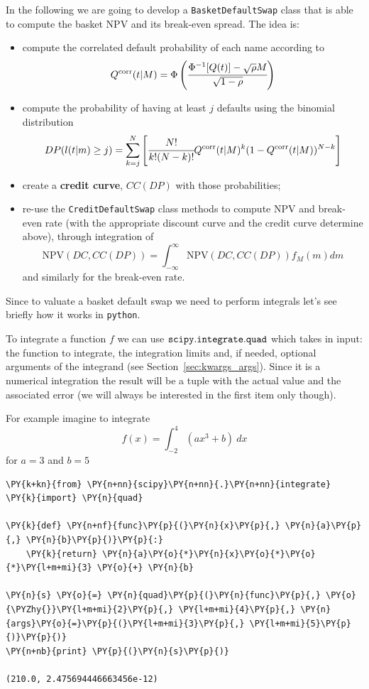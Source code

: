 In the following we are going to develop a \texttt{BasketDefaultSwap} class that is able to compute the basket NPV and its break-even spread.
The idea is:
\begin{itemize}
\item compute the correlated default probability of each name according to 
\begin{equation}
Q^{\textrm{corr}}(t|M) = \Phi\left(\cfrac{\Phi^{-1}[Q(t)]-\sqrt{\rho} M}{\sqrt{1-\rho}}\right)
\end{equation}
\item compute the probability of having at least $j$ defaults using the binomial distribution
\begin{equation}
DP(l(t|m) \ge j) = \sum_{k=j}^{N}\left[  \cfrac{N!}{k!(N-k)!}Q^{\textrm{corr}}(t|M)^k(1-Q^{\textrm{corr}}(t|M))^{N-k}\right]
\end{equation}
\item create a \textbf{credit curve}, $CC(DP)$ with those probabilities;
\item re-use the \texttt{CreditDefaultSwap} class methods to compute NPV and break-even rate (with the appropriate discount curve and the credit curve determine above), through integration of
\begin{equation}
\mathrm{NPV}(DC, CC(DP)) = \int_{-\infty}^{\infty}{\mathrm{NPV}(DC, CC(DP)) f_M(m)dm} 
\end{equation}
and similarly for the break-even rate.
\end{itemize}

Since to valuate a basket default swap we need to perform integrals let's see briefly how it works in \texttt{python}.

To integrate a function \(f\) we can use \(\tt{scipy.integrate.quad}\) which takes in
input: the function to integrate, the integration limits and, if needed, optional arguments of the integrand (see Section~\ref{sec:kwargs_args}). Since it is a numerical integration the result will be a tuple with the actual value and the associated error (we will always be interested in the first item only though).

For example imagine to integrate
\[f(x) = \int_{-2}^{4}(ax^{3} + b)~dx\]
for \(a=3\) and \(b=5\)

\begin{codebox}
\begin{Verbatim}[commandchars=\\\{\}]
\PY{k+kn}{from} \PY{n+nn}{scipy}\PY{n+nn}{.}\PY{n+nn}{integrate} \PY{k}{import} \PY{n}{quad}
	
\PY{k}{def} \PY{n+nf}{func}\PY{p}{(}\PY{n}{x}\PY{p}{,} \PY{n}{a}\PY{p}{,} \PY{n}{b}\PY{p}{)}\PY{p}{:}
    \PY{k}{return} \PY{n}{a}\PY{o}{*}\PY{n}{x}\PY{o}{*}\PY{o}{*}\PY{l+m+mi}{3} \PY{o}{+} \PY{n}{b}
	
\PY{n}{s} \PY{o}{=} \PY{n}{quad}\PY{p}{(}\PY{n}{func}\PY{p}{,} \PY{o}{\PYZhy{}}\PY{l+m+mi}{2}\PY{p}{,} \PY{l+m+mi}{4}\PY{p}{,} \PY{n}{args}\PY{o}{=}\PY{p}{(}\PY{l+m+mi}{3}\PY{p}{,} \PY{l+m+mi}{5}\PY{p}{)}\PY{p}{)}
\PY{n+nb}{print} \PY{p}{(}\PY{n}{s}\PY{p}{)}

(210.0, 2.475694446663456e-12)
\end{Verbatim}
\end{codebox}

